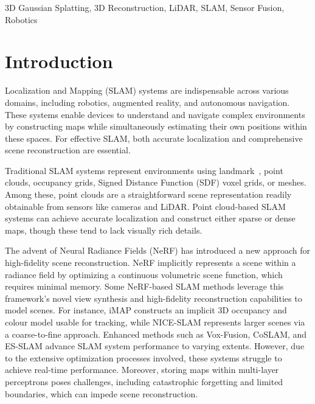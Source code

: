 \documentclass[lettersize,journal]{IEEEtran}
\begin{document}
\begin{IEEEkeywords}
3D Gaussian Splatting, 3D Reconstruction, LiDAR, SLAM, Sensor Fusion, Robotics
\end{IEEEkeywords}

\section{Introduction}
 Localization and Mapping (SLAM) systems are indispensable across various domains, including robotics, augmented reality, and autonomous navigation\cite{kazerouni2022survey}. These systems enable devices to understand and navigate complex environments by constructing maps while simultaneously estimating their own positions within these spaces. For effective SLAM, both accurate localization and comprehensive scene reconstruction are essential.

Traditional SLAM systems represent environments using landmark~\cite{huang2022vwr}, point clouds\cite{li2022intensity}, occupancy grids\cite{elfes1989using}, Signed Distance Function (SDF) voxel grids\cite{reijgwart2019voxgraph}, or meshes\cite{lin2023immesh}. Among these, point clouds are a straightforward scene representation readily obtainable from sensors like cameras and LiDAR. Point cloud-based SLAM systems can achieve accurate localization and construct either sparse or dense maps, though these tend to lack visually rich details.

The advent of Neural Radiance Fields (NeRF) has introduced a new approach for high-fidelity scene reconstruction\cite{mildenhall2021nerf}. NeRF implicitly represents a scene within a radiance field by optimizing a continuous volumetric scene function, which requires minimal memory. Some NeRF-based SLAM methods leverage this framework’s novel view synthesis and high-fidelity reconstruction capabilities to model scenes. For instance, iMAP\cite{imap} constructs an implicit 3D occupancy and colour model usable for tracking, while NICE-SLAM\cite{niceslam} represents larger scenes via a coarse-to-fine approach. Enhanced methods such as Vox-Fusion\cite{voxfusion}, CoSLAM\cite{coslam}, and ES-SLAM\cite{esslam} advance SLAM system performance to varying extents. However, due to the extensive optimization processes involved, these systems struggle to achieve real-time performance. Moreover, storing maps within multi-layer perceptrons poses challenges, including catastrophic forgetting and limited boundaries, which can impede scene reconstruction.
\end{document}
